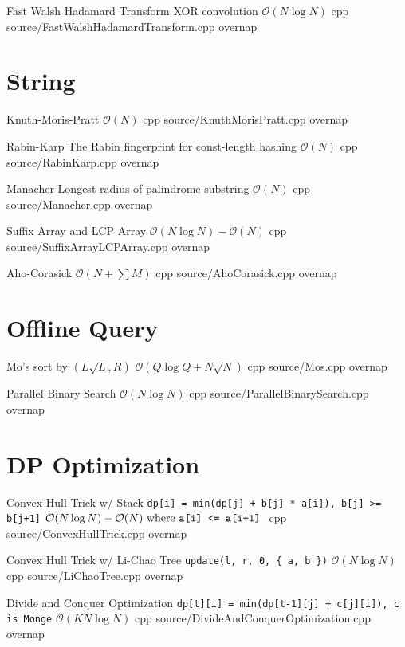 \documentclass[landscape, 10pt, a4paper, oneside, twocolumn]{extarticle}
\begin{document}
\Algorithm
{Fast Walsh Hadamard Transform}
{XOR convolution}
{$\mathcal{O}(N\log{N})$}
{cpp}
{source/FastWalshHadamardTransform.cpp}
{overnap}


\section{String}

\Algorithm
{Knuth-Moris-Pratt}
{}
{$\mathcal{O}(N)$}
{cpp}
{source/KnuthMorisPratt.cpp}
{overnap}

\Algorithm
{Rabin-Karp}
{The Rabin fingerprint for const-length hashing}
{$\mathcal{O}(N)$}
{cpp}
{source/RabinKarp.cpp}
{overnap}

\Algorithm
{Manacher}
{Longest radius of palindrome substring}
{$\mathcal{O}(N)$}
{cpp}
{source/Manacher.cpp}
{overnap}

\Algorithm
{Suffix Array and LCP Array}
{}
{$\mathcal{O}(N\log{N})-\mathcal{O}(N)$}
{cpp}
{source/SuffixArrayLCPArray.cpp}
{overnap}

\Algorithm
{Aho-Corasick}
{}
{$\mathcal{O}(N+\sum{M})$}
{cpp}
{source/AhoCorasick.cpp}
{overnap}


\section{Offline Query}

\Algorithm
{Mo's}
{sort by $(L\sqrt{L}, R)$}
{$\mathcal{O}(Q\log{Q}+N\sqrt{N})$}
{cpp}
{source/Mos.cpp}
{overnap}

\Algorithm
{Parallel Binary Search}
{}
{$\mathcal{O}(N\log{N})$}
{cpp}
{source/ParallelBinarySearch.cpp}
{overnap}


\section{DP Optimization}

\Algorithm
{Convex Hull Trick w/ Stack}
{\texttt{dp[i] = min(dp[j] + b[j] * a[i]), b[j] >= b[j+1]}}
{$\mathcal{O}(N\log{N})-\mathcal{O}(N)\text{ where \texttt{a[i] <= a[i+1]} }$}
{cpp}
{source/ConvexHullTrick.cpp}
{overnap}

\Algorithm
{Convex Hull Trick w/ Li-Chao Tree}
{\texttt{update(l, r, 0, \{ a, b \})}}
{$\mathcal{O}(N\log{N})$}
{cpp}
{source/LiChaoTree.cpp}
{overnap}

\Algorithm
{Divide and Conquer Optimization}
{\texttt{dp[t][i] = min(dp[t-1][j] + c[j][i]), c is Monge}}
{$\mathcal{O}(KN\log{N})$}
{cpp}
{source/DivideAndConquerOptimization.cpp}
{overnap}
\end{document}
